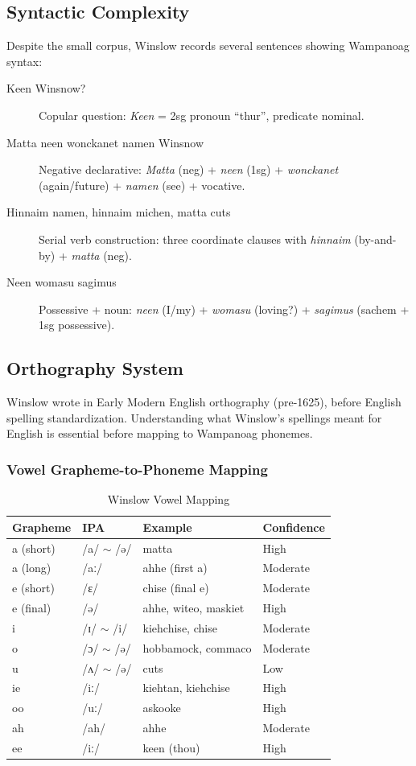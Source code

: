 \subsection{Syntactic Complexity}

Despite the small corpus, Winslow records several sentences showing Wampanoag
syntax:

\begin{description}
  \item[Keen Winsnow?] Copular question: \emph{Keen} = 2sg pronoun ``thur'',
    predicate nominal.
  \item[Matta neen wonckanet namen Winsnow] Negative declarative: \emph{Matta}
    (neg) + \emph{neen} (1sg) + \emph{wonckanet} (again/future) + \emph{namen}
    (see) + vocative.
  \item[Hinnaim namen, hinnaim michen, matta cuts] Serial verb construction:
    three coordinate clauses with \emph{hinnaim} (by-and-by) + \emph{matta}
    (neg).
  \item[Neen womasu sagimus] Possessive + noun: \emph{neen} (I/my) +
    \emph{womasu} (loving?) + \emph{sagimus} (sachem + 1sg possessive).
\end{description}

\subsection{Orthography System}

Winslow wrote in Early Modern English orthography (pre-1625), before English
spelling standardization. Understanding what Winslow's spellings meant for
English is essential before mapping to Wampanoag phonemes.

\subsubsection{Vowel Grapheme-to-Phoneme Mapping}

\begin{table}[htbp]
\centering
\caption{Winslow Vowel Mapping}
\label{tab:1366-vowels}
\begin{tabular}{llll}
\hline
Grapheme & IPA & Example & Confidence \\
\hline
a (short) & /a/ $\sim$ /ə/ & matta & High \\
a (long) & /aː/ & ahhe (first a) & Moderate \\
e (short) & /ɛ/ & chise (final e) & Moderate \\
e (final) & /ə/ & ahhe, witeo, maskiet & High \\
i & /ɪ/ $\sim$ /i/ & kiehchise, chise & Moderate \\
o & /ɔ/ $\sim$ /ə/ & hobbamock, commaco & Moderate \\
u & /ʌ/ $\sim$ /ə/ & cuts & Low \\
ie & /iː/ & kiehtan, kiehchise & High \\
oo & /uː/ & askooke & High \\
ah & /ah/ & ahhe & Moderate \\
ee & /iː/ & keen (thou) & High \\
\hline
\end{tabular}
\end{table}

